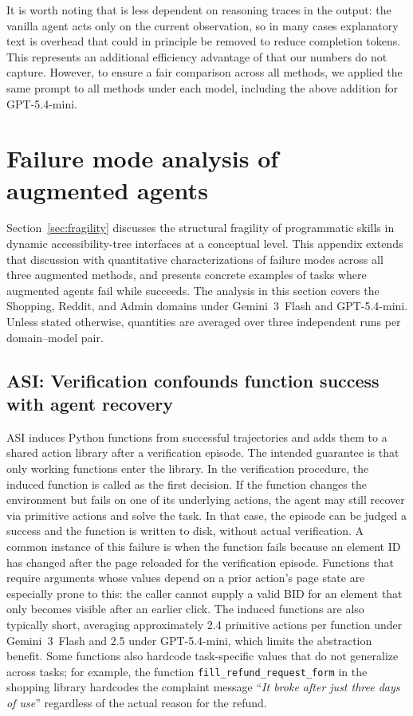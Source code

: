 \noindent It is worth noting that \budgetactor{} is less dependent on reasoning traces in the output: the vanilla agent acts only on the current observation, so in many cases explanatory text is overhead that could in principle be removed to reduce completion tokens.
This represents an additional efficiency advantage of \budgetactor{} that our numbers do not capture.
However, to ensure a fair comparison across all methods, we applied the same prompt to all methods under each model, including the above addition for GPT-5.4-mini.


\section{Failure mode analysis of augmented agents}
\label{app:failure-modes}

Section~\ref{sec:fragility} discusses the structural fragility of programmatic skills in dynamic accessibility-tree interfaces at a conceptual level.
This appendix extends that discussion with quantitative characterizations of failure modes across all three augmented methods, and presents concrete examples of tasks where augmented agents fail while \budgetactor{} succeeds.
The analysis in this section covers the Shopping, Reddit, and Admin domains under Gemini~3~Flash and GPT-5.4-mini.
Unless stated otherwise, quantities are averaged over three independent runs per domain--model pair.

\subsection{ASI: Verification confounds function success with agent recovery}
\label{app:asi-failures}

ASI induces Python functions from successful trajectories and adds them to a shared action library after a verification episode.
The intended guarantee is that only working functions enter the library.
In the verification procedure, the induced function is called as the first decision. If the function changes the environment but fails on one of its underlying actions, the agent may still recover via primitive actions and solve the task. In that case, the episode can be judged a success and the function is written to disk, without actual verification.
A common instance of this failure is when the function fails because an element ID has changed after the page reloaded for the verification episode.
Functions that require arguments whose values depend on a prior action's page state are especially prone to this: the caller cannot supply a valid BID for an element that only becomes visible after an earlier click.
The induced functions are also typically short, averaging approximately 2.4 primitive actions per function under Gemini~3~Flash and 2.5 under GPT-5.4-mini, which limits the abstraction benefit.
Some functions also hardcode task-specific values that do not generalize across tasks; for example, the function \texttt{fill\_refund\_request\_form} in the shopping library hardcodes the complaint message ``\textit{It broke after just three days of use}'' regardless of the actual reason for the refund.

